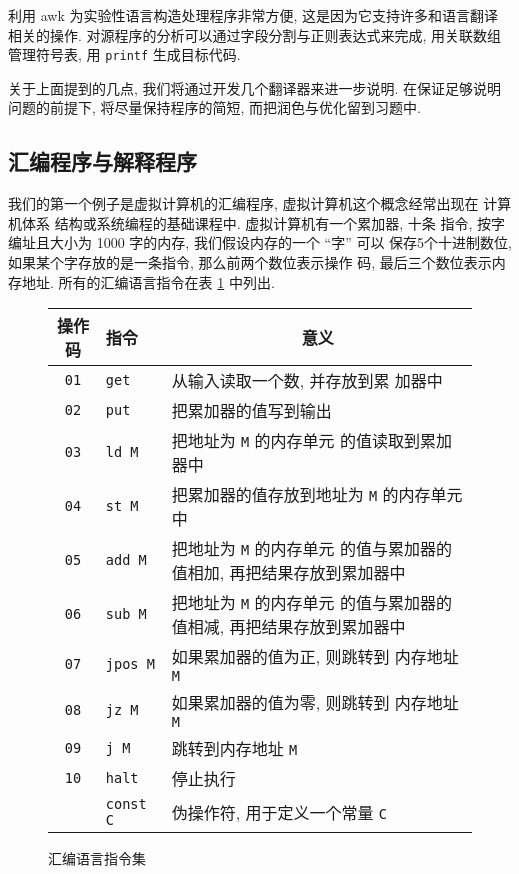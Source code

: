 利用 awk 为实验性语言构造处理程序非常方便, 这是因为它支持许多和语言翻译
相关的操作. 对源程序的分析可以通过字段分割与正则表达式来完成, 用关联数组
管理符号表, 用 \texttt{printf} 生成目标代码.

关于上面提到的几点, 我们将通过开发几个翻译器来进一步说明. 在保证足够说明
问题的前提下,  将尽量保持程序的简短, 而把润色与优化留到习题中.

\subsection{汇编程序与解释程序}
\label{subsec:an_assembler_and_interpreter}

我们的第一个例子是虚拟计算机的汇编程序, 虚拟计算机这个概念经常出现在
计算机体系 结构或系统编程的基础课程中. 虚拟计算机有一个累加器, 十条
指令, 按字编址且大小为 1000 字的内存, 我们假设内存的一个 ``字'' 可以
保存5个十进制数位, 如果某个字存放的是一条指令, 那么前两个数位表示操作
码, 最后三个数位表示内存地址. 所有的汇编语言指令在表
\ref{tbl:assembly_language_instructions} 中列出.
\begin{figure}[ht]
\captionsetup{type=table}
\caption{汇编语言指令集}
\label{tbl:assembly_language_instructions}
\begin{center}
    \begin{tabular}{c|l|l}
        \hline
        \hline
        操作码          & 指令    &
        \multicolumn{1}{c}{意义}  \\
        \hline
        \texttt{01}     & \texttt{get}  & 从输入读取一个数, 并存放到累
        加器中 \\
        \texttt{02}     & \texttt{put}  & 把累加器的值写到输出 \\
        \texttt{03}     & \texttt{ld M}  & 把地址为 \texttt{M} 的内存单元
        的值读取到累加器中 \\
        \texttt{04}     & \texttt{st M}  & 把累加器的值存放到地址为 
        \texttt{M} 的内存单元中 \\
        \texttt{05}     & \texttt{add M} & 把地址为 \texttt{M} 的内存单元 
        的值与累加器的值相加, 再把结果存放到累加器中 \\
        \texttt{06}     & \texttt{sub M} & 把地址为 \texttt{M} 的内存单元 
        的值与累加器的值相减, 再把结果存放到累加器中 \\
        \texttt{07}     & \texttt{jpos M} & 如果累加器的值为正, 则跳转到
        内存地址 \texttt{M} \\
        \texttt{08}     & \texttt{jz M} & 如果累加器的值为零, 则跳转到 
        内存地址 \texttt{M}     \\
        \texttt{09}     & \texttt{j M}  & 跳转到内存地址 \texttt{M} \\
        \texttt{10}     & \texttt{halt} & 停止执行 \\
                        & \texttt{const C} & 伪操作符, 用于定义一个常量
                        \texttt{C} \\
        \hline
    \end{tabular}
\end{center}
\end{figure}

